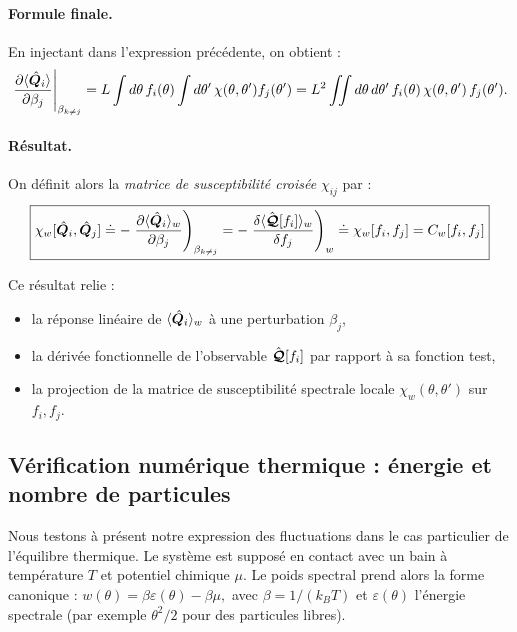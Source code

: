 \paragraph{Formule finale.}
En injectant dans l'expression précédente, on obtient :
\[
\left. \frac{\partial \langle \hat{\bm{Q}}_i \rangle }{ \partial \beta_j } \right|_{\beta_{k \ne j}} = L \int d\theta\, f_i(\theta) \int d\theta'\, \chi(\theta, \theta') f_j(\theta') = L^2 \iint d\theta\, d\theta'\, f_i(\theta)\, \chi(\theta, \theta')\, f_j(\theta').
\]

\paragraph{Résultat.}
On définit alors la {\em matrice de susceptibilité croisée} \( \chi_{ij} \) par :
\[
\boxed{
\chi_w[\hat{\bm{Q}}_i , \hat{\bm{Q}}_j] \doteq - \left. \frac{\partial \langle \hat{\bm{Q}}_i \rangle_w }{ \partial \beta_j } \right)_{\beta_{k \ne j}} = - \left. \frac{\delta \langle \hat{\bm{\mathcal{Q}}}[f_i] \rangle_w }{ \delta f_j } \right)_{w} \doteq  \chi_w[f_i , f_j ] = C_w[f_i , f_j] 
}
\]

Ce résultat relie :
\begin{itemize}[label =$\bullet$] 
  \item la réponse linéaire de \( \langle \hat{\bm{Q}}_i \rangle_w \) à une perturbation \( \beta_j \),
  \item la dérivée fonctionnelle de l’observable \( \hat{\bm{\mathcal{Q}}}[f_i] \) par rapport à sa fonction test,
  \item la projection de la matrice de susceptibilité spectrale locale \( \chi_w(\theta, \theta') \) sur \( f_i, f_j \).
\end{itemize}

\subsection{Vériﬁcation numérique thermique :  énergie et nombre de particules}

Nous testons à présent notre expression des fluctuations dans le cas particulier de l'équilibre thermique. Le système est supposé en contact avec un bain à température \( T \) et potentiel chimique \( \mu \). Le poids spectral prend alors la forme canonique :
\(
w(\theta) = \beta \varepsilon(\theta) - \beta \mu,
\)
avec \( \beta = 1 / (k_B T) \) et \( \varepsilon(\theta) \) l’énergie spectrale (par exemple \( \theta^2/2 \) pour des particules libres).
 


